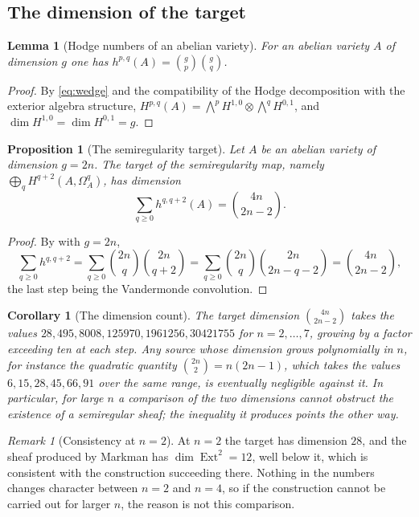 \documentclass[11pt,reqno]{amsart}
\theoremstyle{plain}
\newtheorem{lemma}[theorem]{Lemma}
\newtheorem{proposition}[theorem]{Proposition}
\newtheorem{corollary}[theorem]{Corollary}
\theoremstyle{definition}
\theoremstyle{remark}
\newtheorem{remark}[theorem]{Remark}
\DeclareMathOperator{\Ext}{Ext}
\begin{document}
\subsection{The dimension of the target}

\begin{lemma}[Hodge numbers of an abelian variety]\label{lem:hodgenumbers}
For an abelian variety $A$ of dimension $g$ one has
$h^{p,q}(A)=\binom{g}{p}\binom{g}{q}$.
\end{lemma}

\begin{proof}
By \eqref{eq:wedge} and the compatibility of the Hodge decomposition with the
exterior algebra structure,
$H^{p,q}(A)=\bigwedge^{p}H^{1,0}\otimes\bigwedge^{q}H^{0,1}$, and
$\dim H^{1,0}=\dim H^{0,1}=g$.
\end{proof}

\begin{proposition}[The semiregularity target]\label{prop:target}
Let $A$ be an abelian variety of dimension $g=2n$. The target of the
semiregularity map, namely $\bigoplus_{q}H^{q+2}(A,\Omega^{q}_{A})$, has
dimension
\[
  \sum_{q\ge0}h^{q,q+2}(A)=\binom{4n}{2n-2}.
\]
\end{proposition}

\begin{proof}
By  with $g=2n$,
\[
  \sum_{q\ge0}h^{q,q+2}
  =\sum_{q\ge0}\binom{2n}{q}\binom{2n}{q+2}
  =\sum_{q\ge0}\binom{2n}{q}\binom{2n}{2n-q-2}
  =\binom{4n}{2n-2},
\]
the last step being the Vandermonde convolution.
\end{proof}

\begin{corollary}[The dimension count]\label{cor:countnotbind}
The target dimension $\binom{4n}{2n-2}$ takes the values
$28,495,8008,125970,1961256,30421755$ for $n=2,\dots,7$, growing by a factor
exceeding ten at each step. Any source whose dimension grows polynomially in
$n$, for instance the quadratic quantity $\binom{2n}{2}=n(2n-1)$, which takes
the values $6,15,28,45,66,91$ over the same range, is eventually negligible
against it. In particular, for large $n$ a comparison of the two dimensions
cannot obstruct the existence of a semiregular sheaf; the inequality it
produces points the other way.
\end{corollary}

\begin{remark}[Consistency at $n=2$]\label{rem:markmanconsistent}
At $n=2$ the target has dimension $28$, and the sheaf produced by Markman has
$\dim\Ext^{2}=12$, well below it, which is consistent with the construction
succeeding there. Nothing in the numbers changes character between $n=2$ and
$n=4$, so if the construction cannot be carried out for larger $n$, the reason
is not this comparison.
\end{remark}
\end{document}
